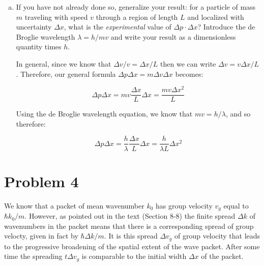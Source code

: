 \documentclass[10pt]{article}
\begin{document}
\begin{enumerate}[(a)]
        \item If you have not already done so, generalize your result: for a particle of mass $m$ traveling with speed $v$ through a region of length $L$ and localized with uncertainty $\Delta x$, what is the \textit{experimental} value of $\Delta p \cdot \Delta x$? Introduce the de Broglie wavelength $\lambda = h/mv$ and write your result as a dimensionless quantity times $h$. 
        
        \begin{solution}
            In general, since we know that $\Delta v/v = \Delta x/L$ then we can write $\Delta v = v \Delta x/L$. Therefore, our general formula $\Delta p \Delta x = m \Delta v \Delta x$ becomes: 

            \[ \Delta p \Delta x = mv \frac{\Delta x}{L}\Delta x = \frac{mv\Delta x^2}{L}\] 

            Using the de Broglie wavelength equation, we know that $mv = h/\lambda$, and so therefore: 

            \[ \Delta p \Delta x = \frac{h}{\lambda} \frac{\Delta x}{L} \Delta x = \frac{h}{\lambda L} \Delta x^2\]
        \end{solution}
    \end{enumerate}

    \pagebreak

    \section*{Problem 4}

    We know that a packet of mean wavenumber $k_0$ has group velocity $v_g$ equal to $\hbar k_0/m$. However, as pointed out in the text (Section 8-8) the finite spread $\Delta k$ of wavenumbers in the packet means that there is a corresponding spread of group velocty, given in fact by $\hbar \Delta k/m$. It is this spread $\Delta v_g$ of group velocity that leads to the progressive broadening of the spatial extent of the wave packet. After some time the spreading $t\Delta v_g$ is comparable to the initial width $\Delta x$ of the packet. 
\end{document}
